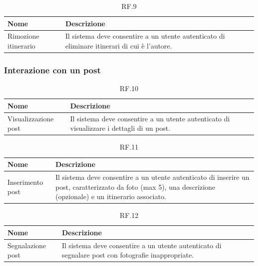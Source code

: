 \documentclass{natourDoc}
\begin{document}
	\begin{table}[H]
		\centering
		\begin{tabular}{ |p{5cm}|p{10.3cm}| }
			\hline
			\rowcolor{PineGreen!70}
			\textbf{Nome} & \textbf{Descrizione} \\
			\hline
			Rimozione itinerario & Il sistema deve consentire a un utente autenticato di eliminare itinerari di cui
			è l'autore. \\
			\hline
		\end{tabular}
		\caption{RF.9}
		\label{table:9}
	\end{table}
	
	\subsubsection{Interazione con un post}
	\begin{table}[H]
		\centering
		\begin{tabular}{ |p{5cm}|p{10.3cm}| }
			\hline
			\rowcolor{PineGreen!70}
			\textbf{Nome} & \textbf{Descrizione} \\
			\hline
			Visualizzazione post & Il sistema deve consentire a un utente autenticato di visualizzare
			i dettagli di un post. \\
			\hline
		\end{tabular}
		\caption{RF.10}
		\label{table:10}
	\end{table}

	\begin{table}[H]
		\centering
		\begin{tabular}{ |p{5cm}|p{10.3cm}| } 
			\hline
			\rowcolor{PineGreen!70}
			\textbf{Nome} & \textbf{Descrizione} \\
			\hline
			Inserimento post &  Il sistema deve consentire a un utente autenticato di inserire un post, 
			caratterizzato da foto (max 5), una descrizione (opzionale) e un itinerario associato. \\
			\hline
		\end{tabular}
		\caption{RF.11}
		\label{table:11}
	\end{table}
	
	
	\begin{table}[H]
		\centering
		\begin{tabular}{ |p{5cm}|p{10.3cm}| }
			\hline
			\rowcolor{PineGreen!70}
			\textbf{Nome} & \textbf{Descrizione} \\
			\hline
			Segnalazione post & Il sistema deve consentire a un utente autenticato di segnalare post con fotografie
			inappropriate. \\
			\hline
		\end{tabular}
		\caption{RF.12}
		\label{table:12}
	\end{table}
\end{document}
